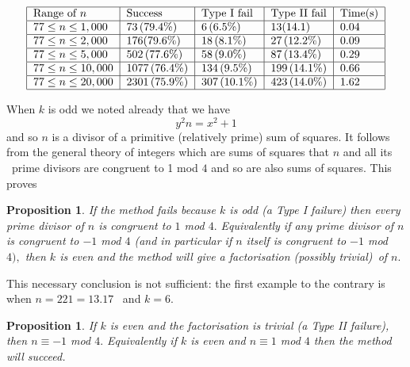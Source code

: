 \documentclass[12pt]{article}
\newtheorem{proposition}[theorem]{Proposition}
\begin{document}
\begin{center}
\begin{equation*}
\begin{tabular}{|l|l|l|l|l|}
\hline
Range of $n$ & Success & Type I fail & Type II fail & Time(s) \\ \hline
$77\leq n\leq 1,000$ & $73\left( 79.4\%\right) $ & $6\left( 6.5\%\right) $ & 
$13(14.1)$ & $0.04$ \\ \hline
$77\leq n\leq 2,000$ & $176(79.6\%)$ & $18\left( 8.1\%\right) $ & $27\left(
12.2\%\right) $ & $0.09$ \\ \hline
$77\leq n\leq 5,000$ & $502\left( 77.6\%\right) $ & $58\left( 9.0\%\right) $
& $87\left( 13.4\%\right) $ & $0.29$ \\ \hline
$77\leq n\leq 10,000$ & $1077\left( 76.4\%\right) $ & $134\left(
9.5\%\right) $ & $199\left( 14.1\%\right) $ & $0.66$ \\ \hline
$77\leq n\leq 20,000$ & $2301\left( 75.9\%\right) $ & $307\left(
10.1\%\right) $ & $423\left( 14.0\%\right) $ & $1.62$ \\ \hline
\end{tabular}%
\end{equation*}
\end{center}

When $k$ is odd we noted already that we have 
\begin{equation*}
y^{2}n=x^{2}+1
\end{equation*}%
and so $n$ is a divisor of a primitive (relatively prime) sum of squares. It
follows from the general theory of integers which are sums of squares %
\cite[Chapter V]{Davenport:1970:THA} that $n$ and all its \ prime divisors
are congruent to 1 mod $4$ and so are also sums of squares. This proves

\begin{proposition}
\label{p1}If the method fails because $k$ is odd (a Type I failure) then
every prime divisor of $n$ is congruent to $1$ mod $4.$ Equivalently if any
prime divisor of $n$ is congruent to $-1$ mod $4$ (and in particular if $n$
itself is congruent to $-1$ mod $4),$ then $k$ is even and the method will
give a factorisation (possibly trivial)\ of $n.$
\end{proposition}

This necessary conclusion is not sufficient: the first example to the
contrary is when $n=221=13.17$ \ and $k=6.$

\begin{proposition}
\label{p2}If $k$ is even and the factorisation is trivial (a Type II
failure), then $n\equiv -1$ mod $4.$ Equivalently if $k$ is even and $%
n\equiv 1$ mod $4$ then the method will succeed.
\end{proposition}
\end{document}
